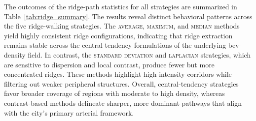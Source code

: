 \noindent
The outcomes of the ridge-path statistics for all strategies are summarized in Table~\ref{tab:ridge_summary}. The results reveal distinct behavioral patterns across the five ridge-walking strategies. The \textsc{average}, \textsc{maximum}, and \textsc{median} methods yield highly consistent ridge configurations, indicating that ridge extraction remains stable across the central-tendency formulations of the underlying \gls{bev}-density field. In contrast, the \textsc{standard deviation} and \textsc{laplacian} strategies, which are sensitive to dispersion and local contrast, produce fewer but more concentrated ridges. These methods highlight high-intensity corridors while filtering out weaker peripheral structures. Overall, central-tendency strategies favor broader coverage of regions with moderate to high density, whereas contrast-based methods delineate sharper, more dominant pathways that align with the city’s primary arterial framework.
